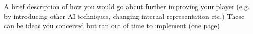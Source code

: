 \documentclass[12pt, letterpaper]{article}
\begin{document}
    A brief description of how you would go about further improving your player (e.g. by introducing other AI techniques, changing internal representation etc.) These can be ideas you conceived but ran out of time to implement (one page)






\pagebreak
\end{document}
